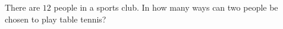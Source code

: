 There are $12$ people in a sports club. In how many ways can two people be chosen to play table tennis?
